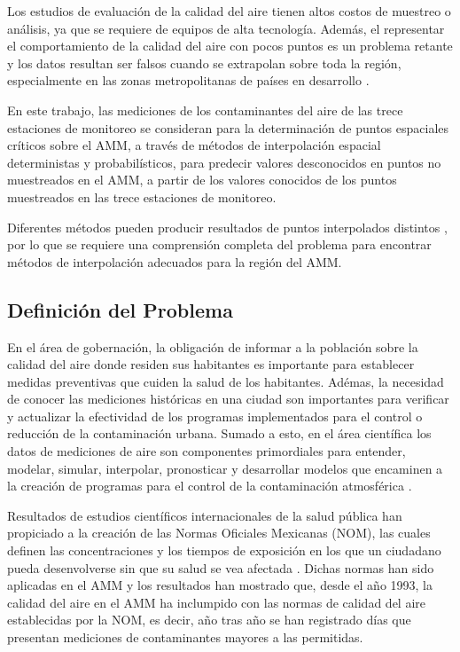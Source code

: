 Los estudios de evaluación de la calidad del aire tienen altos costos de muestreo o análisis, ya que se requiere de equipos de alta tecnología. Además, el representar el comportamiento de la calidad del aire con pocos puntos es un problema retante y los datos resultan ser falsos cuando se extrapolan sobre toda la región,  especialmente en las zonas metropolitanas de países en desarrollo \citep{bayraktar}.

En este trabajo, las mediciones de los contaminantes del aire de las trece estaciones de monitoreo se consideran para la determinación de puntos espaciales críticos sobre el AMM, a través de métodos de interpolación espacial deterministas y probabilísticos, para predecir valores desconocidos en  puntos no muestreados en el AMM, a partir de los valores conocidos de los puntos muestreados en las trece estaciones de monitoreo.

Diferentes métodos pueden producir resultados de puntos interpolados  distintos \citep{tang}, por lo que se requiere una comprensión completa del problema para encontrar métodos de interpolación adecuados para la región del AMM.


\subsection{Definición del Problema}

En el área de gobernación, la obligación de informar a la población sobre la calidad del aire donde residen sus habitantes es importante para establecer medidas preventivas que cuiden la salud de los habitantes. Adémas, la necesidad de conocer las mediciones históricas en una ciudad son importantes para verificar y actualizar la efectividad de los programas implementados para el control o reducción de la contaminación urbana. Sumado a esto, en el área científica los datos de mediciones de aire son componentes primordiales para entender, modelar, simular, interpolar, pronosticar y desarrollar modelos que encaminen a la creación de programas para el control de la contaminación atmosférica \citep{sima}.

Resultados de estudios científicos internacionales de la salud pública han propiciado a la creación de las Normas Oficiales Mexicanas (NOM), las cuales definen las concentraciones y los tiempos de exposición en los que un ciudadano pueda desenvolverse sin que su salud se vea afectada \citep{sima}. Dichas normas han sido aplicadas en el AMM y los resultados han mostrado que, desde el año 1993, la calidad del aire en el AMM ha inclumpido con las normas de calidad del aire establecidas por la NOM, es decir, año tras año se han registrado días que presentan mediciones de contaminantes mayores a las permitidas.

